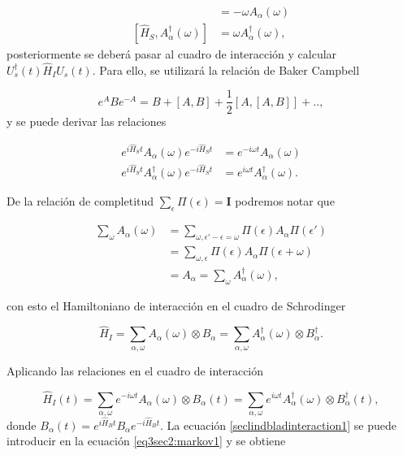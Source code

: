 \begin{align*}
    [\hat{H}_{S},A_{\alpha}(\omega)] & = - \omega A_{\alpha}(\omega) \\
    [\hat{H}_{S},A^{\dagger}_{\alpha}(\omega)] & = \omega A^{\dagger}_{\alpha}(\omega),
\end{align*}
posteriormente se deberá pasar al cuadro de interacción y calcular $U^{\dagger}_{s}(t)\hat{H}_{I}U_{s}(t)$. Para ello, se utilizará la relación de Baker Campbell

\begin{equation}
    e^{A}Be^{-A} = B  + [A,B] + \frac{1}{2}[A,[A,B]] +..,
    \label{sec2lind:baker}
\end{equation}
y se puede derivar las relaciones 

\begin{align*}
    e^{i\hat{H}_{S}t}A_{\alpha}(\omega) e^{-i\hat{H}_{S}t} & = e^{-i\omega t} A_{\alpha}(\omega) \\
    e^{i\hat{H}_{S}t}A^{\dagger}_{\alpha}(\omega) e^{-i\hat{H}_{S}t} & = e^{i\omega t} A^{\dagger}_{\alpha}(\omega).
\end{align*}

De la relación de completitud $\sum_{\epsilon}\Pi(\epsilon) = \mathbf{I}$ podremos notar que

\begin{align*}
   \sum_{\omega}A_{\alpha}(\omega) & =  \sum_{\omega,\epsilon'-\epsilon  = \omega} \Pi(\epsilon) A_{\alpha} \Pi(\epsilon') \\
   & = \sum_{\omega,\epsilon} \Pi(\epsilon) A_{\alpha} \Pi(\epsilon + \omega) \\
   & = A_{\alpha} = \sum_{\omega}A^{\dagger}_{\alpha}(\omega),
\end{align*}

con esto el Hamiltoniano de interacción en el cuadro de Schrodinger

\begin{equation*}
    \hat{H}_{I} = \sum_{\alpha,\omega}A_{\alpha}(\omega) \otimes B_{\alpha} = \sum_{\alpha,\omega}A^{\dagger}_{\alpha}(\omega) \otimes B^{\dagger}_{\alpha}.
\end{equation*}

Aplicando las relaciones en el cuadro de interacción

\begin{equation}
    \hat{H}_{I}(t) = \sum_{\alpha,\omega}e^{-i\omega t}A_{\alpha}(\omega) \otimes B_{\alpha}(t) = \sum_{\alpha,\omega}e^{i\omega t}A^{\dagger}_{\alpha}(\omega) \otimes B^{\dagger}_{\alpha}(t),
    \label{seclindbladinteraction1}
\end{equation}
donde $B_{\alpha}(t) = e^{i\hat{H}_{B}t}B_{\alpha}e^{-i\hat{H}_{B}t}$. La ecuación \ref{seclindbladinteraction1} se puede introducir en la ecuación \ref{eq3sec2:markov1} y se obtiene 


